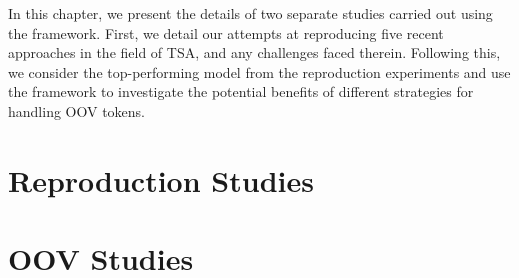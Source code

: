 \documentclass[../../fyp.tex]{subfiles}
\begin{document}
In this chapter, we present the details of two separate studies carried out using the framework. First, we detail our attempts at reproducing five recent approaches in the field of TSA, and any challenges faced therein. Following this, we consider the top-performing model from the reproduction experiments and use the framework to investigate the potential benefits of different strategies for handling OOV tokens.

\section{Reproduction Studies}


\section{OOV Studies}

\end{document}
